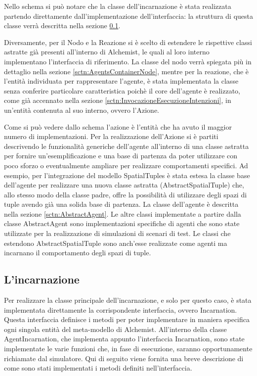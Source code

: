 Nello schema si può notare che la classe dell'incarnazione è stata realizzata partendo direttamente dall'implementazione dell'interfaccia: la struttura di questa classe verrà descritta nella sezione \ref{sctn:AgentIncarnation}.

Diversamente, per il Nodo e la Reazione si è scelto di estendere le rispettive classi astratte già presenti all'interno di Alchemist, le quali al loro interno implementano l'interfaccia di riferimento. La classe del nodo verrà spiegata più in dettaglio nella sezione \ref{sctn:AgentsContainerNode}, mentre per la reazione, che è l'entità individuata per rappresentare l'agente, è stata implementata la classe senza conferire particolare caratteristica poichè il core dell'agente è realizzato, come già accennato nella sezione \ref{sctn:InvocazioneEsecuzioneIntenzioni}, in un'entità contenuta al suo interno, ovvero l'Azione.

Come si può vedere dallo schema l'azione è l'entità che ha avuto il maggior numero di implementazioni. Per la realizzazione dell'Azione si è partiti descrivendo le funzionalità generiche dell'agente all'interno di una classe astratta per fornire un'esemplificazione e una base di partenza da poter utilizzare con poco sforzo o eventualmente ampliare per realizzare comportamenti specifici.
Ad esempio, per l'integrazione del modello SpatialTuples è stata estesa la classe base dell'agente per realizzare una nuova classe astratta (AbstractSpatialTuple) che, allo stesso modo della classe padre, offre la possibilità di utilizzare degli spazi di tuple avendo già una solida base di partenza. La classe dell'agente è descritta nella sezione \ref{sctn:AbstractAgent}.
Le altre classi implementate a partire dalla classe AbstractAgent sono implementazioni specifiche di agenti che sono state utilizzate per la realizzazione di simulazioni di scenari di test. Le classi che estendono AbstractSpatialTuple sono anch'esse realizzate come agenti ma incarnano il comportamento degli spazi di tuple.

\subsection{L'incarnazione}\label{sctn:AgentIncarnation}
Per realizzare la classe principale dell'incarnazione, e solo per questo caso, è stata implementata direttamente la corrispondente interfaccia, ovvero Incarnation.
Questa interfaccia definisce i metodi per poter implementare in maniera specifica ogni singola entità del meta-modello di Alchemist. All'interno della classe AgentIncarnation, che implementa appunto l'interfaccia Incarnation, sono state implementate le varie funzioni che, in fase di esecuzione, saranno opportunamente richiamate dal simulatore. Qui di seguito viene fornita una breve descrizione di come sono stati implementati i metodi definiti nell'interfaccia.


